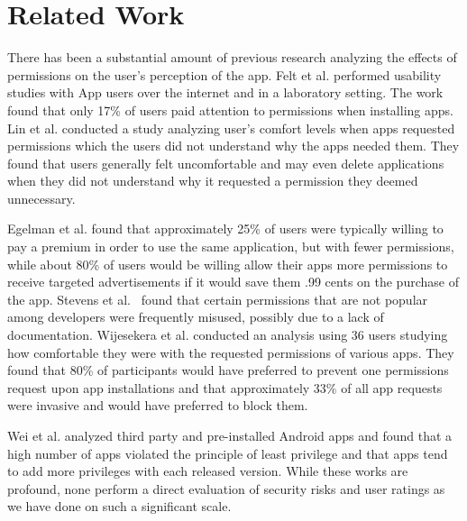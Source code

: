 \documentclass{sig-alternate}
\begin{document}






\section{Related Work}
\label{sec:relatedwork}



There has been a substantial amount of previous research analyzing the effects of permissions on the user's perception of the app. Felt et al.\cite{Felt:2012:APU:2335356.2335360} performed  usability studies with App users over the internet and in a laboratory setting. The work found that only 17\% of users paid attention to permissions when installing apps. Lin et al.\cite{Lin:2012:EPU:2370216.2370290} conducted a study analyzing user's comfort levels when apps requested permissions which the users did not understand why the apps needed them. They found that users generally felt uncomfortable and may even delete applications when they did not understand why it requested a permission they deemed unnecessary.

Egelman et al.\cite{Egelman12choicearchitecture} found that approximately 25\% of users were typically willing to pay a premium in order to use the same application, but with fewer permissions, while about 80\% of users would be willing allow their apps more permissions to receive targeted advertisements if it would save them .99 cents on the purchase of the app. Stevens et al.~\cite{Stevens2013} found that certain permissions that are not popular among developers were frequently misused, possibly due to a lack of documentation. Wijesekera et al.\cite{wijesekera2015android} conducted an analysis using 36 users studying how comfortable they were with the requested permissions of various apps. They found that 80\% of participants would have preferred to prevent one permissions request upon app installations and that approximately 33\% of all app requests were invasive and would have preferred to block them.

Wei et al.\cite{Wei:2012:PEA:2420950.2420956} analyzed third party and pre-installed Android apps and found that a high number of apps violated the principle of least privilege and that apps tend to add more privileges with each released version. While these works are profound, none perform a direct evaluation of security risks and user ratings as we have done on such a significant scale.
\end{document}
